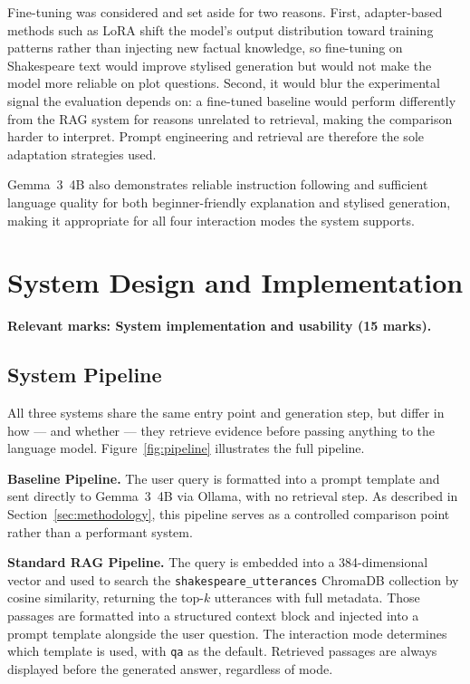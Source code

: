 \documentclass[10pt,conference]{IEEEtran}
\begin{document}
Fine-tuning was considered and set aside for two reasons. First,
adapter-based methods such as LoRA shift the model's output
distribution toward training patterns rather than injecting new
factual knowledge, so fine-tuning on Shakespeare text would improve
stylised generation but would not make the model more reliable on
plot questions. Second, it would blur the experimental signal the
evaluation depends on: a fine-tuned baseline would perform
differently from the RAG system for reasons unrelated to retrieval,
making the comparison harder to interpret. Prompt engineering and
retrieval are therefore the sole adaptation strategies used.

Gemma~3~4B also demonstrates reliable instruction following and
sufficient language quality for both beginner-friendly explanation
and stylised generation, making it appropriate for all four
interaction modes the system supports.

\section{System Design and Implementation}
\label{sec:system}

\textbf{Relevant marks: System implementation and usability
(15 marks).}



\subsection{System Pipeline}

All three systems share the same entry point and generation step,
but differ in how --- and whether --- they retrieve evidence before
passing anything to the language model. Figure~\ref{fig:pipeline}
illustrates the full pipeline.

\textbf{Baseline Pipeline.}
The user query is formatted into a prompt template and sent
directly to Gemma~3~4B via Ollama, with no retrieval step. As
described in Section~\ref{sec:methodology}, this pipeline serves as
a controlled comparison point rather than a performant system.

\textbf{Standard RAG Pipeline.}
The query is embedded into a 384-dimensional vector and used to
search the \texttt{shakespeare\_utterances} ChromaDB collection by
cosine similarity, returning the top-$k$ utterances with full
metadata. Those passages are formatted into a structured context
block and injected into a prompt template alongside the user
question. The interaction mode determines which template is used,
with \texttt{qa} as the default. Retrieved passages are always
displayed before the generated answer, regardless of mode.
\end{document}
